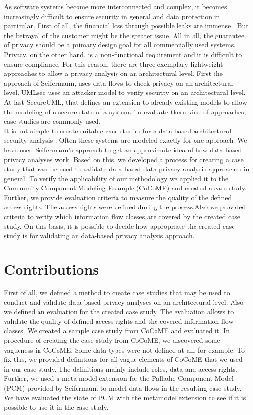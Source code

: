 As software systems become more interconnected and complex, it becomes increasingly difficult to ensure security in general and data protection in particular. First of all, the financial loss through possible leaks are immense \cite{privHarm}. But the betrayal of the customer might be the greater issue. All in all, the guarantee of privacy should be a primary design goal for all commercially used systems. Privacy, on the other hand, is a non-functional requirement and it is difficult to ensure compliance. For this reason, there are three exemplary lightweight approaches to allow a privacy analysis on an architectural level. First the approach of Seifermann\cite{Seifermann16}, uses data flows to check privacy on an architectural level. UMLsec\cite{UMLSec} uses an attacker model to verify security on an architectural level. At last SecureUML\cite{SecureUML}, that defines an extension to already existing models to allow the modeling of a secure state of a system. To evaluate these kind of approaches, case studies are commonly used. \\
It is not simple to create suitable case studies for a data-based architectural security analysis . Often these systems are modeled exactly for one approach. We have used Seifermann's approach\cite{Seifermann16} to get an approximate idea of how data based privacy analyses work. Based on this, we developed a process for creating a case study that can be used to validate data-based data privacy analysis approaches in general. To verify the applicability of our methodology we applied it to the Community Component Modeling Example (CoCoME)\cite{CoCoMETechReport} and created a case study. Further, we provide evaluation criteria to measure the quality of the defined access rights. The access rights were defined during the process.Also we provided criteria to verify which information flow classes are covered by the created case study. On this basis, it is possible to decide how appropriate the created case study is for validating an data-based privacy analysis approach.

\section{Contributions}
First of all, we defined a method to create case studies that may be used to conduct and validate data-based privacy analyses on an architectural level. Also we defined an evaluation for the created case study. The evaluation allows to validate the quality of defined access rights and the covered information flow classes. We created a sample case study from CoCoME\cite{CoCoMETechReport} and evaluated it. In procedure of creating the case study from CoCoME, we discovered some vagueness in CoCoME. Some data types were not defined at all, for example. To fix this, we provided definitions for all vague elements of CoCoME that we used in our case study. The definitions mainly include roles, data and access rights. Further, we used a meta model extension for the Palladio Component Model (PCM)\cite{PCM} provided by Seifermann\cite{MMextension} to model data flows in the resulting case study. We have evaluated the state of PCM with the metamodel extension to see if it is possible to use it in the case study.
